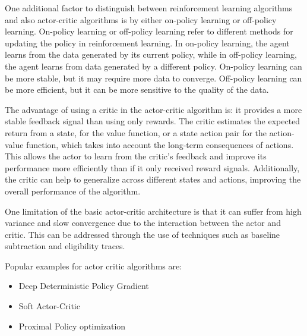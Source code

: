 One additional factor to distinguish between reinforcement learning algorithms and also actor-critic algorithms is by either on-policy learning or off-policy learning. On-policy learning or off-policy learning refer to different methods for updating the policy in reinforcement learning. In on-policy learning, the agent learns from the data generated by its current policy, while in off-policy learning, the agent learns from data generated by a different policy. On-policy learning can be more stable, but it may require more data to converge. Off-policy learning can be more efficient, but it can be more sensitive to the quality of the data.

The advantage of using a critic in the actor-critic algorithm is: it provides a more stable feedback signal than using only rewards. The critic estimates the expected return from a state, for the value function, or a state action pair for the action-value function, which takes into account the long-term consequences of actions. This allows the actor to learn from the critic's feedback and improve its performance more efficiently than if it only received reward signals. Additionally, the critic can help to generalize across different states and actions, improving the overall performance of the algorithm.

One limitation of the basic actor-critic architecture is that it can suffer from high variance and slow convergence due to the interaction between the actor and critic. This can be addressed through the use of techniques such as baseline subtraction and eligibility traces.

Popular examples for actor critic algorithms are:
\begin{itemize}
	\item Deep Deterministic Policy Gradient
	\item Soft Actor-Critic
	\item Proximal Policy optimization
\end{itemize}



